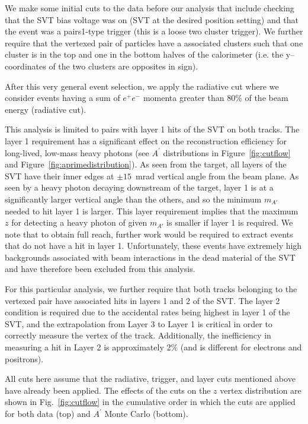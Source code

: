 \documentclass[twocolumn, showpacs, preprintnumbers,prd, superscriptaddress]{revtex4-1}
\begin{document}
We make some initial cuts to the data before our analysis that include checking that the SVT bias voltage was on (SVT at the desired position setting) and that the event was a pairs1-type trigger (this is a loose two cluster trigger). We further require that the vertexed pair of particles have a associated clusters such that one cluster is in the top and one in the bottom halves of the calorimeter (i.e. the y--coordinates of the two clusters are opposites in sign). 

After this very general event selection, we apply the radiative cut where we consider events having a sum of $e^+e^-$ momenta greater than 80\% of the beam energy (radiative cut). 

This analysis is limited to pairs with layer 1 hits of the SVT on both tracks. The layer 1 requirement has a significant effect on the reconstruction efficiency for long-lived, low-mass heavy photons (see $A^{\prime}$ distributions in Figure~\ref{fig:cutflow} and Figure~\ref{fig:aprimedistribution}). As seen from the target, all layers of the SVT have their inner edges at $\pm 15$~mrad vertical angle from the beam plane. As seen by a heavy photon decaying downstream of the target, layer 1 is at a significantly larger vertical angle than the others, and so the minimum $m_{A'}$ needed to hit layer 1 is larger. This layer requirement implies that the maximum $z$ for detecting a heavy photon of given $m_{A'}$ is smaller if layer 1 is required. We note that to obtain full reach, further work would be required to extract events that do not have a hit in layer 1. Unfortunately, these events have extremely high backgrounds associated with beam interactions in the dead material of the SVT and have therefore been excluded from this analysis. 

For this particular analysis, we further require that both tracks belonging to the vertexed pair have associated hits in layers 1 and 2 of the SVT. The layer 2 condition is required due to the accidental rates being highest in layer 1 of the SVT, and the extrapolation from Layer 3 to Layer 1 is critical in order to correctly measure the vertex of the track. Additionally, the inefficiency in measuring a hit in Layer 2 is approximately 2$\%$ (and is different for electrons and positrons).  

All cuts here assume that the radiative, trigger, and layer cuts mentioned above have already been applied. The effects of the cuts  on the $z$ vertex distribution are shown in Fig.~\ref{fig:cutflow} in the cumulative order in which the cuts are applied for both data (top) and $A^{\prime}$ Monte Carlo (bottom).
\end{document}
